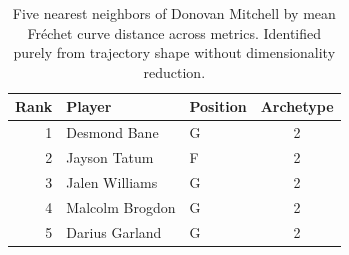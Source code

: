 \begin{table}[htbp]
  \centering\small
  \begin{tabular}{rllc}
    \toprule
    Rank & Player & Position & Archetype \\
    \midrule
    1 & Desmond Bane & G & 2 \\
    2 & Jayson Tatum & F & 2 \\
    3 & Jalen Williams & G & 2 \\
    4 & Malcolm Brogdon & G & 2 \\
    5 & Darius Garland & G & 2 \\
    \bottomrule
  \end{tabular}
  \caption{Five nearest neighbors of Donovan Mitchell by mean Fr\'{e}chet curve distance across metrics. Identified purely from trajectory shape without dimensionality reduction.}
  \label{tab:Donovan_Mitchell_frechet_curve_neighbors}
\end{table}

